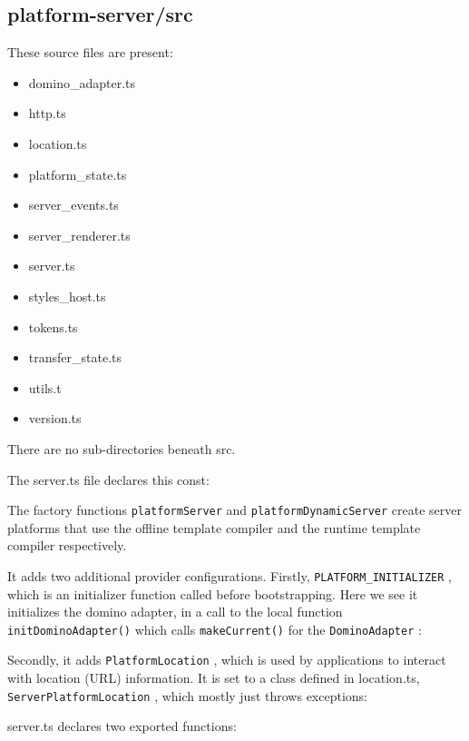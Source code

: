 \subsection{platform-server/src}

These source files are present:

\begin{itemize}
  \item domino\_adapter.ts
  \item http.ts
  \item location.ts
  \item platform\_state.ts
  \item server\_events.ts
  \item server\_renderer.ts
  \item server.ts
  \item styles\_host.ts
  \item tokens.ts
  \item transfer\_state.ts
  \item utils.t
  \item version.ts
\end{itemize}

There are no sub-directories beneath src.

The server.ts file declares this const:



The factory functions
\texttt{platformServer}
and
\texttt{platformDynamicServer}
create server
platforms that use the offline template compiler and the runtime template compiler
respectively.

It adds two additional provider configurations. Firstly,
\texttt{PLATFORM\_INITIALIZER}
, which
is an initializer function called before bootstrapping. Here we see it initializes the
domino adapter, in a call to the local function
\texttt{initDominoAdapter()}
which calls
\texttt{makeCurrent()}
for the
\texttt{DominoAdapter}
:



Secondly, it adds
\texttt{PlatformLocation}
, which is used by applications to interact with
location (URL) information. It is set to a class defined in location.ts,
\texttt{ServerPlatformLocation}
, which mostly just throws exceptions:



server.ts declares two exported functions:

